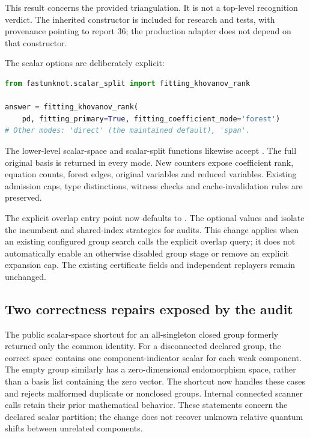 This result concerns the provided triangulation. It is not a top-level
recognition verdict. The inherited constructor is included for research
and tests, with provenance pointing to report 36; the production adapter
does not depend on that constructor.

The scalar options are deliberately explicit:

\noindent\begin{minipage}{\linewidth}
\begin{lstlisting}[language=Python]
from fastunknot.scalar_split import fitting_khovanov_rank

answer = fitting_khovanov_rank(
    pd, fitting_primary=True, fitting_coefficient_mode='forest')
# Other modes: 'direct' (the maintained default), 'span'.
\end{lstlisting}
\end{minipage}

The lower-level scalar-space and scalar-split functions likewise accept
. The full original basis is returned in every
mode. New counters expose coefficient rank, equation counts, forest
edges, original variables and reduced variables. Existing admission caps,
type distinctions, witness checks and cache-invalidation rules are
preserved.

The explicit overlap entry point now defaults to .
The optional values  and  isolate the
incumbent and shared-index strategies for audits. This change applies when
an existing configured group search calls the explicit overlap query; it
does not automatically enable an otherwise disabled group stage or remove
an explicit expansion cap. The existing certificate fields and independent
replayers remain unchanged.

\subsection{Two correctness repairs exposed by the audit}

The public scalar-space shortcut for an all-singleton closed group formerly
returned only the common identity. For a disconnected declared group, the
correct space contains one component-indicator scalar for each weak
component. The empty group similarly has a zero-dimensional endomorphism
space, rather than a basis list containing the zero vector. The shortcut
now handles these cases and rejects malformed duplicate or nonclosed
groups. Internal connected scanner calls retain their prior mathematical
behavior. These statements concern the declared scalar partition; the
change does not recover unknown relative quantum shifts between unrelated
components.

